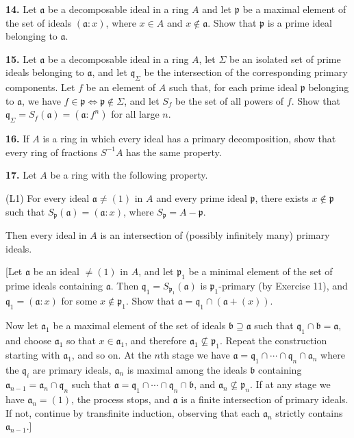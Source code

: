\medskip
\noindent\textbf{14.} Let $\mathfrak a$ be a decomposable ideal in a ring $A$ and let $\mathfrak p$ be a maximal element of the
set of ideals $(\mathfrak a:x)$, where $x\in A$ and $x\notin\mathfrak a$.  Show that $\mathfrak p$ is a prime ideal belonging
to $\mathfrak a$.

\medskip
\noindent\textbf{15.} Let $\mathfrak a$ be a decomposable ideal in a ring $A$, let $\Sigma$ be an isolated set of prime ideals
belonging to $\mathfrak a$, and let $\mathfrak q_\Sigma$ be the intersection of the corresponding primary
components.  Let $f$ be an element of $A$ such that, for each prime ideal $\mathfrak p$ belonging
to $\mathfrak a$, we have $f\in\mathfrak p\Longleftrightarrow\mathfrak p\notin\Sigma$, and let $S_f$ be the set of all powers of $f$.  Show that
$\mathfrak q_\Sigma=S_f(\mathfrak a)=(\mathfrak a:f^n)$ for all large $n$.

\medskip
\noindent\textbf{16.} If $A$ is a ring in which every ideal has a primary decomposition, show that every
ring of fractions $S^{-1}A$ has the same property.

\medskip
\noindent\textbf{17.} Let $A$ be a ring with the following property.

(L1) For every ideal $\mathfrak a\ne(1)$ in $A$ and every prime ideal $\mathfrak p$, there exists $x\notin\mathfrak p$ such
that $S_\mathfrak p(\mathfrak a)=(\mathfrak a:x)$, where $S_\mathfrak p=A-\mathfrak p$.

Then every ideal in $A$ is an intersection of (possibly infinitely many) primary
ideals.

[Let $\mathfrak a$ be an ideal $\ne(1)$ in $A$, and let $\mathfrak p_1$ be a minimal element of the set of prime
ideals containing $\mathfrak a$.  Then $\mathfrak q_1=S_{\mathfrak p_1}(\mathfrak a)$ is $\mathfrak p_1$-primary (by Exercise 11), and $\mathfrak q_1=
(\mathfrak a:x)$ for some $x\notin\mathfrak p_1$.  Show that $\mathfrak a=\mathfrak q_1\cap(\mathfrak a+(x))$.

Now let $\mathfrak a_1$ be a maximal element of the set of ideals $\mathfrak b\supseteq\mathfrak a$ such that
$\mathfrak q_1\cap\mathfrak b=\mathfrak a$, and choose $\mathfrak a_1$ so that $x\in\mathfrak a_1$, and therefore $\mathfrak a_1\nsubseteq\mathfrak p_1$.  Repeat the
construction starting with $\mathfrak a_1$, and so on.  At the $n$th stage we have $\mathfrak a=\mathfrak q_1\cap\cdots
\cap\mathfrak q_n\cap\mathfrak a_n$ where the $\mathfrak q_i$ are primary ideals, $\mathfrak a_n$ is maximal among the ideals $\mathfrak b$ containing $\mathfrak a_{n-1}=\mathfrak a_n\cap\mathfrak q_n$ such that $\mathfrak a=\mathfrak q_1\cap\cdots\cap\mathfrak q_n\cap\mathfrak b$, and $\mathfrak a_n\nsubseteq\mathfrak p_n$.  If at any
stage we have $\mathfrak a_n=(1)$, the process stops, and $\mathfrak a$ is a finite intersection of
primary ideals.  If not, continue by transfinite induction, observing that each $\mathfrak a_n$
strictly contains $\mathfrak a_{n-1}$.]

